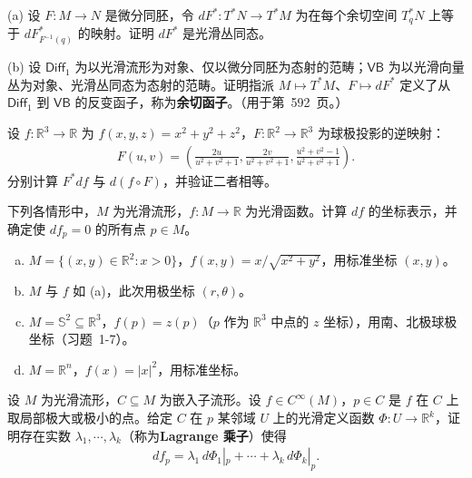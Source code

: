 \documentclass[../../main.tex]{subfiles}
\begin{document}
\begin{exercise}\label{exercise:ch11-08}
(a) 设 $F\colon M\to N$ 是微分同胚，令 $dF^*\colon T^*N\to T^*M$ 为在每个余切空间 $T_q^*N$ 上等于 $dF^*_{F^{-1}(q)}$ 的映射。证明 $dF^*$ 是光滑丛同态。

(b) 设 $\mathsf{Diff}_1$ 为以光滑流形为对象、仅以微分同胚为态射的范畴；$\mathsf{VB}$ 为以光滑向量丛为对象、光滑丛同态为态射的范畴。证明指派 $M\mapsto T^*M$、$F\mapsto dF^*$ 定义了从 $\mathsf{Diff}_1$ 到 $\mathsf{VB}$ 的反变函子，称为\textbf{余切函子}。（用于第~592~页。）
\end{exercise}

\begin{exercise}\label{exercise:ch11-09}
设 $f\colon\mathbb{R}^3\to\mathbb{R}$ 为 $f(x,y,z)=x^2+y^2+z^2$，$F\colon\mathbb{R}^2\to\mathbb{R}^3$ 为球极投影的逆映射：
\begin{align*}
F(u,v)=\left(\frac{2u}{u^2+v^2+1},\frac{2v}{u^2+v^2+1},\frac{u^2+v^2-1}{u^2+v^2+1}\right).
\end{align*}
分别计算 $F^*df$ 与 $d(f\circ F)$，并验证二者相等。
\end{exercise}

\begin{exercise}\label{exercise:ch11-10}
下列各情形中，$M$ 为光滑流形，$f\colon M\to\mathbb{R}$ 为光滑函数。计算 $df$ 的坐标表示，并确定使 $df_p=0$ 的所有点 $p\in M$。
\begin{enumerate}[(a)]
\item $M=\{(x,y)\in\mathbb{R}^2:x>0\}$，$f(x,y)=x/\sqrt{x^2+y^2}$，用标准坐标 $(x,y)$。
\item $M$ 与 $f$ 如 (a)，此次用极坐标 $(r,\theta)$。
\item $M=\mathbb{S}^2\subseteq\mathbb{R}^3$，$f(p)=z(p)$（$p$ 作为 $\mathbb{R}^3$ 中点的 $z$ 坐标），用南、北极球极坐标（习题~1-7）。
\item $M=\mathbb{R}^n$，$f(x)=|x|^2$，用标准坐标。
\end{enumerate}
\end{exercise}

\begin{exercise}\label{exercise:ch11-11}
设 $M$ 为光滑流形，$C\subseteq M$ 为嵌入子流形。设 $f\in C^\infty(M)$，$p\in C$ 是 $f$ 在 $C$ 上取局部极大或极小的点。给定 $C$ 在 $p$ 某邻域 $U$ 上的光滑定义函数 $\Phi\colon U\to\mathbb{R}^k$，证明存在实数 $\lambda_1,\cdots ,\lambda_k$（称为\textbf{Lagrange 乘子}）使得
\begin{align*}
df_p=\lambda_1\,d\Phi_1|_p+\cdots+\lambda_k\,d\Phi_k|_p.
\end{align*}
\end{exercise}
\end{document}

